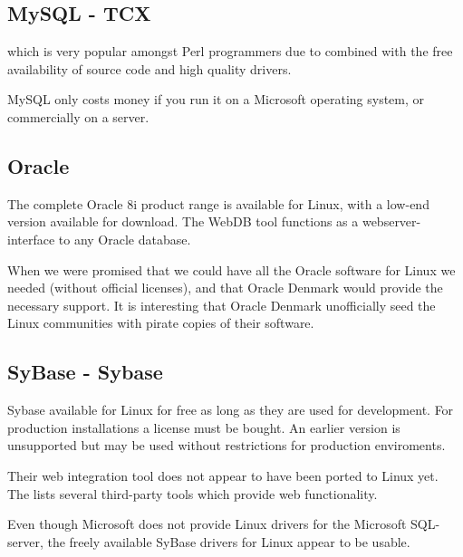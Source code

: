\subsection{MySQL - TCX}
\label{sec:mysql}

 which is
very popular amongst Perl programmers due to
combined with the free availability of source code and high quality
drivers.

MySQL only costs money if you run it on a Microsoft operating system,
or commercially on a server.

\subsection{Oracle}
\label{sec:oracle}

The complete Oracle 8i product range is available for Linux, with a
low-end version available for download.  The WebDB tool functions as a
webserver-interface to any Oracle database.

When
 we were promised that we
could have all the Oracle software for Linux we needed (without
official licenses), and that Oracle Denmark would provide the
necessary support.  It is interesting that Oracle Denmark unofficially
seed the Linux communities with pirate copies of their software.

\subsection{SyBase - Sybase}

Sybase  available for
  Linux for free as long as they are used for development.  For
  production installations a license must be bought.  An earlier
  version is unsupported but may be used without restrictions for
  production enviroments.
  
  Their web integration tool does not appear to have been ported to
  Linux yet.  The  lists several third-party tools which provide web
  functionality.

  Even though Microsoft does not provide Linux drivers for the
  Microsoft SQL-server, the freely available SyBase drivers for Linux
  appear to be usable.

